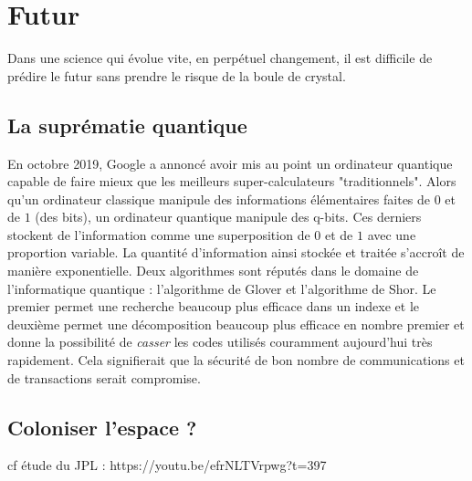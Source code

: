 \documentclass[a4paper,11pt]{book}
\begin{document}
\section{Futur}
Dans une science qui évolue vite, en perpétuel changement, il est difficile de prédire le futur sans prendre le risque de la boule de crystal. 
\subsection{La suprématie quantique}
En octobre 2019, Google a annoncé avoir mis au point un ordinateur quantique capable de faire mieux que les meilleurs super-calculateurs "traditionnels". Alors qu'un ordinateur classique manipule des informations élémentaires faites de $0$ et de $1$ (des bits), un ordinateur quantique manipule des q-bits. Ces derniers stockent de l'information comme une superposition de $0$ et de $1$ avec une proportion variable. La quantité d'information ainsi stockée et traitée s'accroît de manière exponentielle. Deux algorithmes sont réputés dans le domaine de l'informatique quantique : l'algorithme de Glover et l'algorithme de Shor. Le premier permet une recherche beaucoup plus efficace dans un indexe et le deuxième permet une décomposition beaucoup plus efficace en nombre premier et donne la possibilité de \textit{casser} les codes utilisés couramment aujourd'hui très rapidement. Cela signifierait que la sécurité de bon nombre de communications et de transactions serait compromise.

\subsection{Coloniser l'espace ?}
cf étude du JPL :
https://youtu.be/efrNLTVrpwg?t=397
\end{document}
